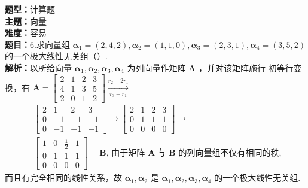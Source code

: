 \documentclass{ctexart}
\newenvironment{question}[5]{%
	\noindent\textbf{题型：}#1\\
	\textbf{主题：}#2\\
	\textbf{难度：}#3\\
	\textbf{题目：}#4\\
	\textbf{解析：}#5\\
	\vspace{1em}
}{}
\begin{document}
	\begin{question}
		{计算题}
		{向量}
		{容易}
		{6.求向量组 \(\boldsymbol{\alpha}_1=(2,4,2), \boldsymbol{\alpha}_2=(1,1,0), \boldsymbol{\alpha}_3=(2,3,1), \boldsymbol{\alpha}_4=(3,5,2)\) 的一个极大线性无关组（）. }
		{以所给向量 \(\boldsymbol{\alpha}_1, \boldsymbol{\alpha}_2, \boldsymbol{\alpha}_3, \boldsymbol{\alpha}_4\) 为列向量作矩阵 \(\mathbf{A}\) ，并对该矩阵施行
			初等行变换，有 \(\mathbf{A}=\left[\begin{array}{llll}2 & 1 & 2 & 3 \\ 4 & 1 & 3 & 5 \\ 2 & 0 & 1 & 2\end{array}\right] \xrightarrow[r_3-r_1]{r_2-2 r_1}\)
			\[
			\begin{aligned}
				& {\left[\begin{array}{cccc}
						2 & 1 & 2 & 3 \\
						0 & -1 & -1 & -1 \\
						0 & -1 & -1 & -1
					\end{array}\right] \rightarrow\left[\begin{array}{llll}
						2 & 1 & 2 & 3 \\
						0 & 1 & 1 & 1 \\
						0 & 0 & 0 & 0
					\end{array}\right] \rightarrow} \\
				& {\left[\begin{array}{llll}
						1 & 0 & \frac{1}{2} & 1 \\
						0 & 1 & 1 & 1 \\
						0 & 0 & 0 & 0
					\end{array}\right]=\mathbf{B} \text {, 由于矩阵 } \mathbf{A} \text { 与 } \mathbf{B} \text { 的列向量组不仅有相同的秩, }}
			\end{aligned}
			\]
			而且有完全相同的线性关系，故 \(\boldsymbol{\alpha}_1, \boldsymbol{\alpha}_2\) 是 \(\boldsymbol{\alpha}_1, \boldsymbol{\alpha}_2, \boldsymbol{\alpha}_3, \boldsymbol{\alpha}_4\) 的一个极大线性无关组. }
	\end{question}
	
\end{document}
